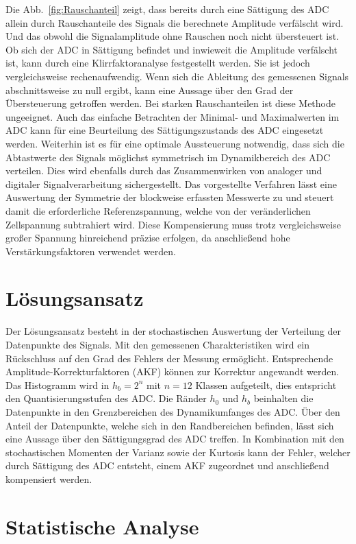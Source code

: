 Die Abb.~\ref{fig:Rauschanteil} zeigt, dass bereits durch eine Sättigung des ADC allein durch Rauschanteile des Signals die berechnete Amplitude verfälscht wird. Und das obwohl die Signalamplitude ohne Rauschen noch nicht übersteuert ist. Ob sich der ADC in Sättigung befindet und inwieweit die Amplitude verfälscht ist, kann durch eine Klirrfaktoranalyse festgestellt werden. Sie ist jedoch vergleichsweise rechenaufwendig. Wenn sich die Ableitung des gemessenen Signals abschnittsweise zu null ergibt, kann eine Aussage über den Grad der Übersteuerung getroffen werden. Bei starken Rauschanteilen ist diese Methode ungeeignet. Auch das einfache Betrachten der Minimal- und Maximalwerten im ADC kann für eine Beurteilung des Sättigungszustands des ADC eingesetzt werden.
Weiterhin ist es für eine optimale Aussteuerung notwendig, dass sich die Abtastwerte des Signals möglichst symmetrisch im Dynamikbereich des ADC verteilen. Dies wird ebenfalls durch das Zusammenwirken von analoger und digitaler Signalverarbeitung sichergestellt. Das vorgestellte Verfahren lässt eine Auswertung der Symmetrie der blockweise erfassten Messwerte zu und steuert damit die erforderliche Referenzspannung, welche von der veränderlichen Zellspannung subtrahiert wird. Diese Kompensierung muss trotz vergleichsweise großer Spannung hinreichend präzise erfolgen, da anschließend hohe Verstärkungsfaktoren verwendet werden.

\section{Lösungsansatz}

Der Lösungsansatz besteht in der stochastischen Auswertung der Verteilung der Datenpunkte des Signals. Mit den gemessenen Charakteristiken wird ein Rückschluss auf den Grad des Fehlers der Messung ermöglicht. Entsprechende Amplitude-Korrekturfaktoren (AKF) können zur Korrektur angewandt werden. Das Histogramm wird in $h_b = 2^n$ mit $n = 12$ Klassen aufgeteilt, dies entspricht den Quantisierungsstufen des ADC. Die Ränder $h_0$ und $h_b$ beinhalten die Datenpunkte in den Grenzbereichen des Dynamikumfanges des ADC. Über den Anteil der Datenpunkte, welche sich in den Randbereichen befinden, lässt sich eine Aussage über den Sättigungsgrad des ADC treffen. In Kombination mit den stochastischen Momenten der Varianz sowie der Kurtosis kann der Fehler, welcher durch Sättigung des ADC entsteht, einem AKF zugeordnet und anschließend kompensiert werden.  

\section{Statistische Analyse}


